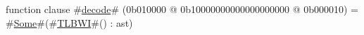function clause #\hyperref[zdecode]{decode}# (0b010000 @ 0b10000000000000000000 @ 0b000010) = #\hyperref[zSome]{Some}#(#\hyperref[zTLBWI]{TLBWI}#() : ast)

